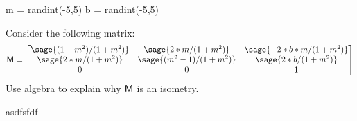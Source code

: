 \documentclass{ximera}
\author{Jenny Sheldon \and Bart Snapp}
\begin{document}
\makerandom
 
\begin{sagesilent}
  m = randint(-5,5)
  b = randint(-5,5)
\end{sagesilent}

\begin{exercise}
  Consider the following matrix:
  \[
  \mat{M} = 
  \begin{bmatrix}
    \sage{(1-m^2)/(1+m^2)} & \sage{2*m/(1+m^2)} & \sage{-2*b*m/(1+m^2)}\\
    \sage{2*m/(1+m^2)} & \sage{(m^2-1)/(1+m^2)} & \sage{2*b/(1+m^2)}\\
    0 & 0 & 1
  \end{bmatrix}
  \]
  Use algebra to explain why $\mathsf{M}$ is an isometry.
  \begin{prompt}
    \begin{solution}
      asdfsfdf
    \end{solution}
  \end{prompt}
\end{exercise}
\end{document}
